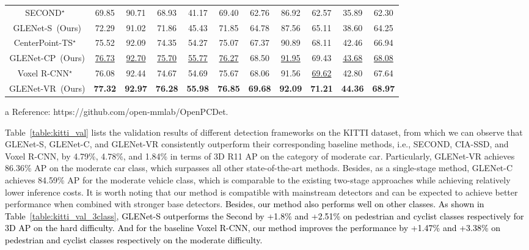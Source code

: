 \documentclass[twocolumn]{svjour3}
\newcommand{\revise}[1]{\textcolor{black}{#1}}
\begin{document}
\begin{table*}[hbp]
\begin{threeparttable}
\begin{tabular}{c|ccccc|ccccc}
			\hline
			SECOND${}^{\star}$~\citep{yan2018second}      & 69.85   & 90.71 & 68.93  & 41.17    & 69.40   & 62.76   & 86.92 & 62.57  & 35.89    & 62.30    \\
			GLENet-S~(Ours)          & 72.29   & 91.02 & 71.86  & 45.43    & 71.85   & 64.78   & 87.56 & 65.11  & 38.60    & 64.25    \\ 
			\hline
			CenterPoint-TS$\mathrm{}^\star$~\citep{yin2021center} & 75.52  & 92.09  & 74.35  & 54.27  & 75.07    & 67.37  & 90.89  & 68.11  & 42.46  & 66.94   \\
			GLENet-CP~(Ours)                       & \underline{76.73}  & \underline{92.70}  & \underline{75.70}  & \underline{55.77}  & \underline{76.27}    & 68.50  & \underline{91.95}  & 69.43  & \underline{43.68}  & \underline{68.08}   \\ 
			\hline
			Voxel R-CNN$\mathrm {}^{\star}$~\citep{deng2021voxel}  & 76.08   & 92.44 & 74.67  & 54.69    & 75.67   & 68.06   & 91.56 & \underline{69.62}  & 42.80    & 67.64    \\
			GLENet-VR~(Ours)         & \textbf{77.32}   & \textbf{92.97} & \textbf{76.28}  & \textbf{55.98}    & \textbf{76.85}   & \textbf{69.68}   & \textbf{92.09} & \textbf{71.21}  & \textbf{44.36}    & \textbf{68.97}    \\
			\bottomrule
		\end{tabular}
        \begin{tablenotes}
            \item[a] Reference: https://github.com/open-mmlab/OpenPCDet.
        \end{tablenotes}
        \end{threeparttable}
\end{table*}
\setlength{\tabcolsep}{1.5pt}

Table~\ref{table:kitti_val} lists the validation results of different detection frameworks on the KITTI dataset, from which we can observe that GLENet-S, GLENet-C, and GLENet-VR consistently outperform their corresponding baseline methods, i.e., SECOND, CIA-SSD, and Voxel R-CNN, by 4.79\%, 4.78\%, and 1.84\% in terms of 3D R11 AP on the category of moderate car. Particularly, GLENet-VR achieves 86.36\% AP on the moderate car class, which surpasses all other state-of-the-art methods. Besides, as a single-stage method, GLENet-C achieves 84.59\% AP for the moderate vehicle class, which is comparable to the existing two-stage approaches while achieving relatively lower inference costs. It is worth noting that our method is compatible with mainstream detectors and can be expected to achieve better performance when combined with stronger base detectors.
\revise{Besides, our method also performs well on other classes. As shown in Table~\ref{table:kitti_val_3class}, GLENet-S outperforms the Second by +1.8\% and +2.51\% on pedestrian and cyclist classes respectively for 3D AP on the hard difficulty. And for the baseline Voxel R-CNN, our method improves the performance by +1.47\% and +3.38\% on pedestrian and cyclist classes respectively on the moderate difficulty.}
\end{document}
